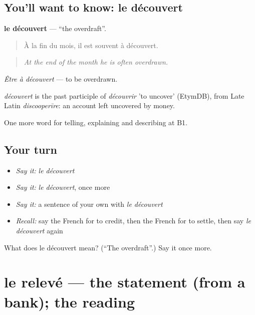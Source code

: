 \subsection*{You'll want to know: le découvert}
\textbf{le découvert} — \textquotedblleft{}the overdraft\textquotedblright{}.

\begin{quote}
À la fin du mois, il est souvent à découvert.
\end{quote}

\begin{quote}
\emph{At the end of the month he is often overdrawn.}
\end{quote}

\emph{Être à découvert} — to be overdrawn.

\begin{cousinweb}
\emph{découvert} is the past participle of \emph{découvrir} 'to uncover' (EtymDB), from Late Latin \emph{discooperīre}: an account left uncovered by money.
\end{cousinweb}

\begin{grammarlens}[title={What you've built}]
One more word for telling, explaining and describing at B1.
\end{grammarlens}

\subsection*{Your turn}
\begin{itemize}
\raggedright
  \item \emph{Say it:} \emph{le découvert}
  \item \emph{Say it:} \emph{le découvert}, once more
  \item \emph{Say it:} a sentence of your own with \emph{le découvert}
  \item \emph{Recall:} say the French for to credit, then the French for to settle, then say \emph{le découvert} again
\end{itemize}

\begin{tcolorbox}[breakable,colback=teal!4,colframe=teal!35!black,title={Before you move on}]
What does le découvert mean? (\textquotedblleft{}The overdraft\textquotedblright{}.) Say it once more.
\end{tcolorbox}
\section[le relevé]{le relevé — the statement (from a bank); the reading}

